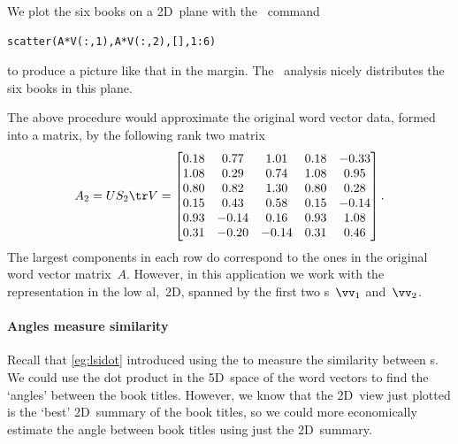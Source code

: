 \begin{reduce}
\begin{enumerate}
{}
We plot the six books on a 2D~plane with the \script\ command
\begin{verbatim}
scatter(A*V(:,1),A*V(:,2),[],1:6)
\end{verbatim}
to produce a picture like that in the margin.
The \svd\ analysis nicely distributes the six books in this plane.
\end{enumerate}

The above procedure would approximate the original word vector data, formed into a matrix, by the following rank two matrix \twodp
\begin{equation*}
A_2=US_2\tr V
=\begin{bmatrix} 0.18&0.77&1.01&0.18&-0.33
\\1.08&0.29&0.74&1.08&0.95
\\0.80&0.82&1.30&0.80&0.28
\\0.15&0.43&0.58&0.15&-0.14
\\0.93&-0.14&0.16&0.93&1.08
\\0.31&-0.20&-0.14&0.31&0.46 \end{bmatrix}.
\end{equation*}
The largest components in each row do correspond to the ones in the original word vector matrix~\(A\).
However, in this application we work with the representation in the low al,~2D,  spanned by the first two s~\(\vv_1\) and~\(\vv_2\).


\paragraph{Angles measure similarity}
Recall that \cref{eg:lsidot} introduced using the  to measure the similarity between s.
We could use the dot product in the 5D~space of the word vectors to find the `angles' between the book titles.
However, we know that the 2D~view just plotted is the `best' 2D~summary of the book titles, so we could more economically estimate the angle between book titles using just the 2D~summary.


\end{reduce}
